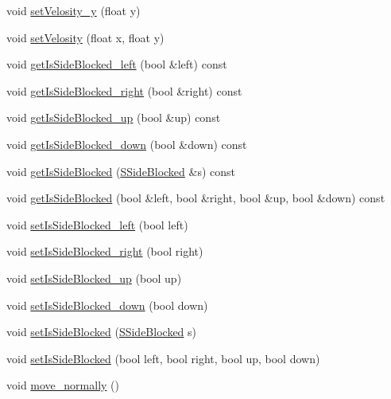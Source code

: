 \begin{DoxyCompactItemize}
\item 
void \hyperlink{classengine_1_1CMovable_ac1ed31991776939ada3d50e551017ab4}{set\-Velosity\-\_\-y} (float y)
\item 
void \hyperlink{classengine_1_1CMovable_a5e7a42eb65b12035d2c6104f28f2f0fc}{set\-Velosity} (float x, float y)
\item 
void \hyperlink{classengine_1_1CMovable_a5774652cd5369fad6b08cf4de56f91c0}{get\-Is\-Side\-Blocked\-\_\-left} (bool \&left) const 
\item 
void \hyperlink{classengine_1_1CMovable_a7790f286b529e31de0226f72c574faef}{get\-Is\-Side\-Blocked\-\_\-right} (bool \&right) const 
\item 
void \hyperlink{classengine_1_1CMovable_a542748edb84d3e43bb479278c8b38e06}{get\-Is\-Side\-Blocked\-\_\-up} (bool \&up) const 
\item 
void \hyperlink{classengine_1_1CMovable_a85d5cf13541670517f1a49d57d49107a}{get\-Is\-Side\-Blocked\-\_\-down} (bool \&down) const 
\item 
void \hyperlink{classengine_1_1CMovable_a7252ea478abaab25c1774ccfd1f52554}{get\-Is\-Side\-Blocked} (\hyperlink{structengine_1_1SSideBlocked}{S\-Side\-Blocked} \&s) const 
\item 
void \hyperlink{classengine_1_1CMovable_a19c9b69038fe22d0a08228b7eaed8c1b}{get\-Is\-Side\-Blocked} (bool \&left, bool \&right, bool \&up, bool \&down) const 
\item 
void \hyperlink{classengine_1_1CMovable_aa7f9177dee6821517c845f1d369f8cde}{set\-Is\-Side\-Blocked\-\_\-left} (bool left)
\item 
void \hyperlink{classengine_1_1CMovable_af1059fe2fbaf39598efe0a234d8cbc9e}{set\-Is\-Side\-Blocked\-\_\-right} (bool right)
\item 
void \hyperlink{classengine_1_1CMovable_a73ec50c7ed0037c4abe4aaa41ffe68d7}{set\-Is\-Side\-Blocked\-\_\-up} (bool up)
\item 
void \hyperlink{classengine_1_1CMovable_a454f67c854ad8f16c7251bc1011a2673}{set\-Is\-Side\-Blocked\-\_\-down} (bool down)
\item 
void \hyperlink{classengine_1_1CMovable_aafcffa645994fb19515bcb84cf083c9f}{set\-Is\-Side\-Blocked} (\hyperlink{structengine_1_1SSideBlocked}{S\-Side\-Blocked} s)
\item 
void \hyperlink{classengine_1_1CMovable_a61e5537f10e7ff0f111c1ad355f0f6ed}{set\-Is\-Side\-Blocked} (bool left, bool right, bool up, bool down)
\item 
void \hyperlink{classengine_1_1CMovable_a6184018afcab4be164c3b02228175a9c}{move\-\_\-normally} ()

\end{DoxyCompactItemize}
